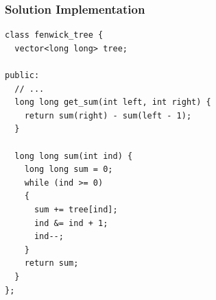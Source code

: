 \documentclass{beamer}
\newcommand{\lightojlink}[2]{LightOJ (http://www.lightoj.com)
  problem: \href{#2}{\textcolor{blue}{#1}.}}
\newcommand{\hint}[1]{
\begin{bclogo}[arrondi=0.1, logo=\bclampe]{Hint}
#1
\end{bclogo}
}
\newcounter{exo}
\newcommand{\exo}{
  \addtocounter{exo}{1}
  Exercice \arabic{exo}
}
\begin{document}
\begin{frame}[containsverbatim]
\frametitle{Solution Implementation}

\scriptsize

\begin{lstlisting}[mathescape]
class fenwick_tree {
  vector<long long> tree;

public:
  // ...
  long long get_sum(int left, int right) {
    return sum(right) - sum(left - 1);
  }

  long long sum(int ind) {
    long long sum = 0;
    while (ind >= 0)
    {
      sum += tree[ind];
      ind &= ind + 1;
      ind--;
    }
    return sum;
  }
};
\end{lstlisting}

\end{frame}

\fi


\ifanswers
\end{document}
